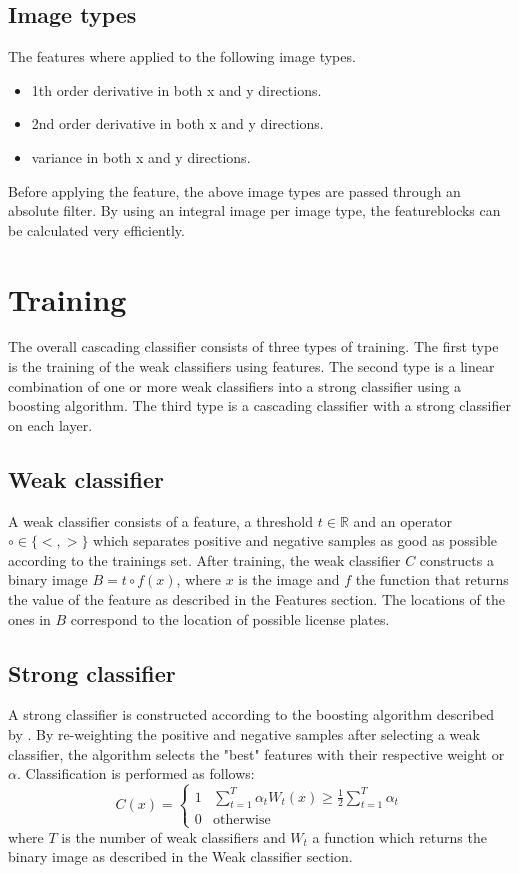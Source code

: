\documentclass[a4paper,11pt]{article}
\begin{document}
\subsection*{Image types}
The features where applied to the following image types.
\begin{itemize}
	\item{1th order derivative in both x and y directions.}
	\item{2nd order derivative in both x and y directions.}
	\item{variance in both x and y directions.}
\end{itemize}
Before applying the feature, the above image types are passed through an
absolute filter. By using an integral image \cite{viola} per image type, the
featureblocks can be calculated very efficiently.


\section*{Training}
The overall cascading classifier consists of three types of training. The first
type is the training of the weak classifiers using features. The second type is
a linear combination of one or more weak classifiers into a strong classifier
using a boosting algorithm. The third type is a cascading classifier
with a strong classifier on each layer.

\subsection*{Weak classifier}
A weak classifier consists of a feature, a threshold $t \in \mathbb{R}$ and an
operator $\circ \in \{<, >\}$ which separates positive and negative samples as
good as possible according to the trainings set. After training, the weak
classifier $C$ constructs a binary image $B = t \circ f(x)$, where $x$ is the
image and $f$ the function that returns the value of the feature as described
in the Features section. The locations of the ones in $B$ correspond to the
location of possible license plates.

\subsection*{Strong classifier}
A strong classifier is constructed according to the boosting algorithm
described by \cite{viola}.  By re-weighting the positive and
negative samples after selecting a weak classifier, the algorithm selects the
"best" features with their respective weight or $\alpha$. Classification is
performed as follows:
\begin{displaymath}
C(x) = 
	\left\{ \begin{array}{ll}
		1 & \sum^T_{t=1} \alpha_t W_t(x) \ge \frac{1}{2} \sum^T_{t=1}\alpha_t \\
		0 & \textrm{otherwise}
	\end{array} \right.
\end{displaymath}
where $T$ is the number of weak classifiers and $W_t$ a function which returns
the binary image as described in the Weak classifier section.
\end{document}
